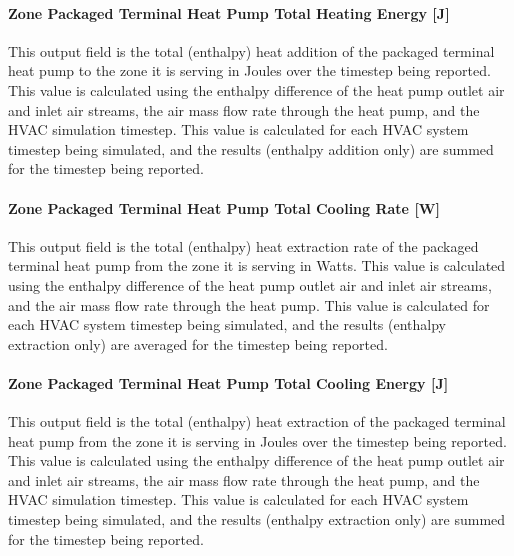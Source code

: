 \paragraph{Zone Packaged Terminal Heat Pump Total Heating Energy {[}J{]}}\label{zone-packaged-terminal-heat-pump-total-heating-energy-j}

This output field is the total (enthalpy) heat addition of the packaged terminal heat pump to the zone it is serving in Joules over the timestep being reported. This value is calculated using the enthalpy difference of the heat pump outlet air and inlet air streams, the air mass flow rate through the heat pump, and the HVAC simulation timestep. This value is calculated for each HVAC system timestep being simulated, and the results (enthalpy addition only) are summed for the timestep being reported.

\paragraph{Zone Packaged Terminal Heat Pump Total Cooling Rate {[}W{]}}\label{zone-packaged-terminal-heat-pump-total-cooling-rate-w}

This output field is the total (enthalpy) heat extraction rate of the packaged terminal heat pump from the zone it is serving in Watts. This value is calculated using the enthalpy difference of the heat pump outlet air and inlet air streams, and the air mass flow rate through the heat pump. This value is calculated for each HVAC system timestep being simulated, and the results (enthalpy extraction only) are averaged for the timestep being reported.

\paragraph{Zone Packaged Terminal Heat Pump Total Cooling Energy {[}J{]}}\label{zone-packaged-terminal-heat-pump-total-cooling-energy-j}

This output field is the total (enthalpy) heat extraction of the packaged terminal heat pump from the zone it is serving in Joules over the timestep being reported. This value is calculated using the enthalpy difference of the heat pump outlet air and inlet air streams, the air mass flow rate through the heat pump, and the HVAC simulation timestep. This value is calculated for each HVAC system timestep being simulated, and the results (enthalpy extraction only) are summed for the timestep being reported.

